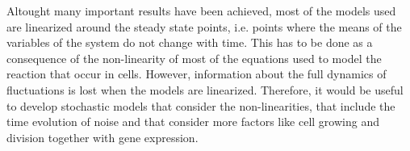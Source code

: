 Altought many important results have been achieved, most of the models used are linearized around the steady state points, i.e. points where the means of the variables of the system do not change with time. This has to be done as a consequence of the non-linearity of most of the equations used to model the reaction that occur in cells. However, information about the full dynamics of fluctuations is lost when the models are linearized. Therefore, it would be useful to develop stochastic models that consider the non-linearities, that include the time evolution of noise and that consider more factors like cell growing and division together with gene expression.

\renewcommand{\thefigure}{\arabic{chapter}.\arabic{section}.\arabic{figure}}
